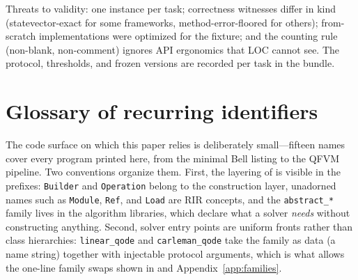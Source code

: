 Threats to validity: one instance per task; correctness witnesses differ
in kind (statevector-exact for some frameworks, method-error-floored for
others); from-scratch implementations were optimized for the fixture; and
the counting rule (non-blank, non-comment) ignores API ergonomics that
LOC cannot see.  The protocol, thresholds, and frozen versions are
recorded per task in the bundle.

\section{Glossary of recurring identifiers}
\label{app:glossary}

The code surface on which this paper relies is deliberately small---fifteen
names cover every program printed here, from the minimal Bell listing to
the QFVM pipeline.  Two conventions organize them.  First, the layering of
 is visible in the prefixes: \texttt{Builder} and
\texttt{Operation} belong to the construction layer, unadorned names such
as \texttt{Module}, \texttt{Ref}, and \texttt{Load} are RIR concepts, and
the \texttt{abstract\_*} family lives in the algorithm libraries, which
declare what a solver \emph{needs} without constructing anything.
Second, solver entry points are uniform fronts rather than class
hierarchies: \texttt{linear\_qode} and \texttt{carleman\_qode} take the
family as data (a name string) together with injectable protocol
arguments, which is what allows the one-line family swaps shown in
 and Appendix~\ref{app:families}.

